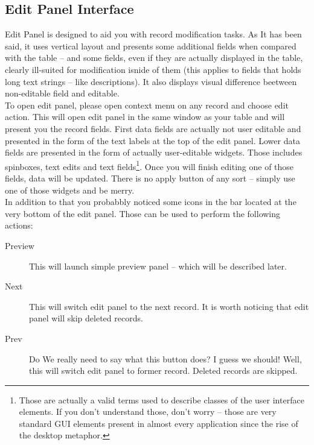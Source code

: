 \subsection{Edit Panel Interface}
Edit Panel is designed to aid you with record modification tasks. As It has been said, it uses vertical layout and presents some additional fields when compared with the table -- and some fields, even if they are actually displayed in the table, clearly ill-suited for modification isnide of them (this applies to fields that holds long text strings -- like descriptions). It also displays visual difference beetween non-editable field and editable.\\
To open edit panel, please open context menu on any record and choose edit action. This will open edit panel in the same window as your table and will present you the record fields. First data fields are actually not user editable and presented in the form of the text labels at the top of the edit panel. Lower data fields are presented in the form of actually user-editable widgets. Those includes spinboxes, text edits and text fields\footnote{Those are actually a valid terms used to describe classes of the user interface elements. If you don't understand those, don't worry -- those are very standard {GUI} elements present in almost every application since the rise of the desktop metaphor.}. Once you will finish editing one of those fields, data will be updated. There is no apply button of any sort -- simply use one of those widgets and be merry.\\
In addition to that you probabbly noticed some icons in the bar located at the very bottom of the edit panel. Those can be used to perform the following actions:

\begin{description}
  \item[Preview] This will launch simple preview panel -- which will be described later.
  \item[Next] This will switch edit panel to the next record. It is worth noticing that edit panel will skip deleted records.
  \item[Prev] Do We really need to say what this button does? I guess we should! Well, this will switch edit panel to former record. Deleted records are skipped.
\end{description}

